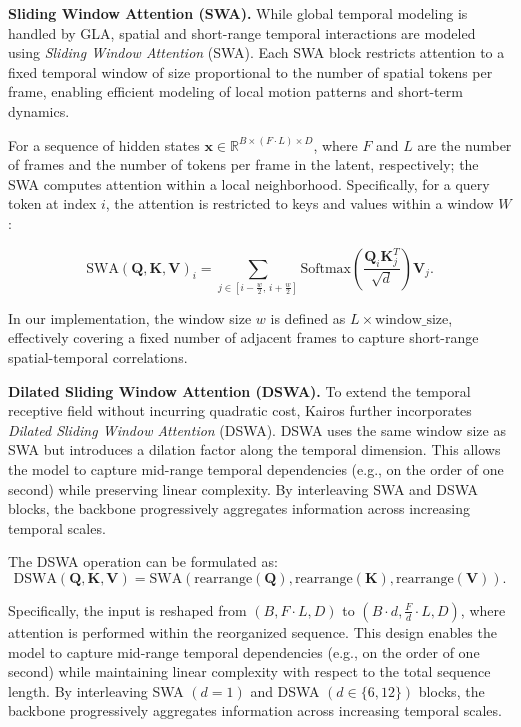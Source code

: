 \textbf{Sliding Window Attention (SWA).} While global temporal modeling is handled by GLA, spatial and short-range temporal interactions are modeled using \emph{Sliding Window Attention} (SWA). Each SWA block restricts attention to a fixed temporal window of size proportional to the number of spatial tokens per frame, enabling efficient modeling of local motion patterns and short-term dynamics.


For a sequence of hidden states $\mathbf{x} \in \mathbb{R}^{B \times (F \cdot L) \times D}$, 
where $F$ and $L$ are the number of frames and the number of tokens per frame in the latent, respectively;
the SWA computes attention within a local neighborhood. Specifically, 
for a query token at index $i$, the attention is restricted to keys and values 
within a window $W$:

\begin{equation}
\mathrm{SWA}(\mathbf{Q}, \mathbf{K}, \mathbf{V})_i
=
\sum_{j \in [i - \frac{w}{2},\, i + \frac{w}{2}]}
\mathrm{Softmax}\!\left(\frac{\mathbf{Q}_i \mathbf{K}_j^{T}}{\sqrt{d}}\right)\mathbf{V}_j .
\end{equation}

In our implementation, the window size $w$ is defined as $L \times \text{window\_size}$, 
effectively covering a fixed number of adjacent frames to capture short-range 
spatial-temporal correlations.



\textbf{Dilated Sliding Window Attention (DSWA).} To extend the temporal receptive field without incurring quadratic cost, Kairos further incorporates \emph{Dilated Sliding Window Attention} (DSWA). DSWA uses the same window size as SWA but introduces a dilation factor along the temporal dimension. This allows the model to capture mid-range temporal dependencies (e.g., on the order of one second) while preserving linear complexity. By interleaving SWA and DSWA blocks, the backbone progressively aggregates information across increasing temporal scales.


The DSWA operation can be formulated as:
\begin{equation}
\mathrm{DSWA}(\mathbf{Q}, \mathbf{K}, \mathbf{V})
=
\mathrm{SWA}\!\left(
\mathrm{rearrange}(\mathbf{Q}),
\mathrm{rearrange}(\mathbf{K}),
\mathrm{rearrange}(\mathbf{V})
\right).
\end{equation}

Specifically, the input is reshaped from $(B, F\!\cdot\!L, D)$ to 
$(B\!\cdot\!d, \tfrac{F}{d}\!\cdot\!L, D)$, where attention is performed 
within the reorganized sequence. This design enables the model to capture 
mid-range temporal dependencies (e.g., on the order of one second) while 
maintaining linear complexity with respect to the total sequence length. 
By interleaving SWA $(d = 1)$ and DSWA $(d \in \{6, 12\})$ blocks, 
the backbone progressively aggregates information across increasing temporal scales.
 

